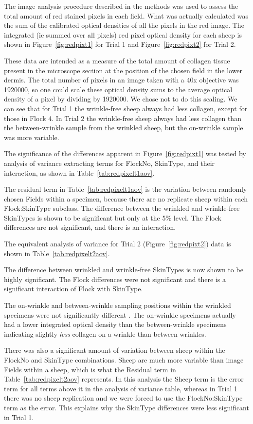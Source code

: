 \documentclass[titlepage]{article}  %
\begin{document}
 The image analysis procedure described in the methods was used to assess the total amount of red stained pixels in each field.  What was actually calculated was the sum of the calibrated optical densities of all the pixels in the red image. The integrated (ie summed over all pixels) red pixel optical density for each sheep is shown  in Figure~\ref{fig:redpixt1} for Trial 1 and Figure~\ref{fig:redpixt2} for Trial 2.


These data are intended as a measure of the total amount of collagen tissue present in the microscope section at the position of the chosen field in the lower dermis.
The total number of pixels in an image taken with a 40x objective was 1920000, so one could scale these optical density sums to the average optical density of a pixel by dividing by 1920000. We chose not to do this scaling.
We can see that for Trial 1 the wrinkle-free sheep always had less collagen, except for those in Flock 4. In Trial 2  the wrinkle-free sheep always had less collagen than the between-wrinkle sample from the wrinkled sheep, but the on-wrinkle sample was more variable.

The significance of the differences apparent in Figure~\ref{fig:redpixt1} was tested by analysis of variance extracting terms for FlockNo, SkinType, and their interaction, as shown in Table~\ref{tab:redpixelt1aov}.

The residual term in Table~\ref{tab:redpixelt1aov} is the variation between randomly chosen Fields within a specimen, because there are no replicate sheep within each Flock:SkinType subclass. The difference between the wrinkled and wrinkle-free SkinTypes is shown to be significant but only at the 5\% level. The Flock differences are not significant, and there is an interaction.

The equivalent analysis of variance for Trial 2 (Figure~\ref{fig:redpixt2}) data is shown in Table~\ref{tab:redpixelt2aov}.

The difference between wrinkled and wrinkle-free SkinTypes is now shown to be highly significant. The Flock differences were not significant and there is a significant interaction of Flock with SkinType.  

 The on-wrinkle and between-wrinkle sampling positions within the wrinkled specimens were not significantly different . The on-wrinkle specimens actually had a lower integrated optical density than the between-wrinkle specimens indicating slightly {\em less} collagen on a wrinkle than between wrinkles.

There was also a significant amount of variation between sheep within the FlockNo and SkinType combinations. Sheep are much more variable than image Fields within a sheep, which is what the Residual term in Table~\ref{tab:redpixelt2aov} represents. In this analysis the Sheep term is the error term for all terms above it in the analysis of variance table, whereas in Trial 1 there was no sheep replication and we were forced to use the FlockNo:SkinType term as the error. This explains why the SkinType differences were less significant in Trial 1. 
\end{document}
